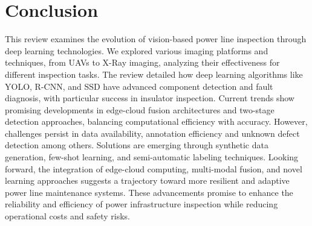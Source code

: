 \section{Conclusion}\label{sec:conclusion}
This review examines the evolution of vision-based power line inspection through deep learning technologies. We explored various imaging platforms and techniques, from UAVs to X-Ray imaging, analyzing their effectiveness for different inspection tasks. The review detailed how deep learning algorithms like YOLO, R-CNN, and SSD have advanced component detection and fault diagnosis, with particular success in insulator inspection. Current trends show promising developments in edge-cloud fusion architectures and two-stage detection approaches, balancing computational efficiency with accuracy. However, challenges persist in data availability, annotation efficiency and unknown defect detection among others. Solutions are emerging through synthetic data generation, few-shot learning, and semi-automatic labeling techniques. Looking forward, the integration of edge-cloud computing, multi-modal fusion, and novel learning approaches suggests a trajectory toward more resilient and adaptive power line maintenance systems. These advancements promise to enhance the reliability and efficiency of power infrastructure inspection while reducing operational costs and safety risks.